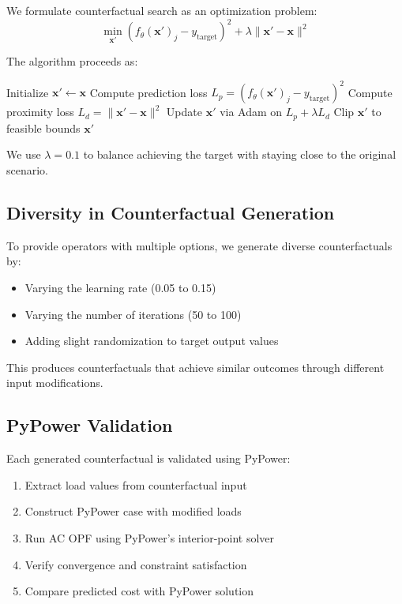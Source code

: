 \documentclass[journal,12pt,onecolumn]{IEEEtran}
\begin{document}
We formulate counterfactual search as an optimization problem:
\begin{equation}
\min_{\mathbf{x}'} (f_\theta(\mathbf{x}')_j - y_{\text{target}})^2 + \lambda \|\mathbf{x}' - \mathbf{x}\|^2
\label{eq:cf_loss}
\end{equation}

The algorithm proceeds as:
\begin{algorithmic}[1]
\STATE Initialize $\mathbf{x}' \leftarrow \mathbf{x}$
    \STATE Compute prediction loss $L_p = (f_\theta(\mathbf{x}')_j - y_{\text{target}})^2$
    \STATE Compute proximity loss $L_d = \|\mathbf{x}' - \mathbf{x}\|^2$
    \STATE Update $\mathbf{x}'$ via Adam on $L_p + \lambda L_d$
    \STATE Clip $\mathbf{x}'$ to feasible bounds
\ENDFOR
\RETURN $\mathbf{x}'$
\end{algorithmic}

We use $\lambda = 0.1$ to balance achieving the target with staying close to the original scenario.

\subsection{Diversity in Counterfactual Generation}

To provide operators with multiple options, we generate diverse counterfactuals by:
\begin{itemize}
    \item Varying the learning rate (0.05 to 0.15)
    \item Varying the number of iterations (50 to 100)
    \item Adding slight randomization to target output values
\end{itemize}

This produces counterfactuals that achieve similar outcomes through different input modifications.

\subsection{PyPower Validation}

Each generated counterfactual is validated using PyPower:
\begin{enumerate}
    \item Extract load values from counterfactual input
    \item Construct PyPower case with modified loads
    \item Run AC OPF using PyPower's interior-point solver
    \item Verify convergence and constraint satisfaction
    \item Compare predicted cost with PyPower solution
\end{enumerate}
\end{document}
